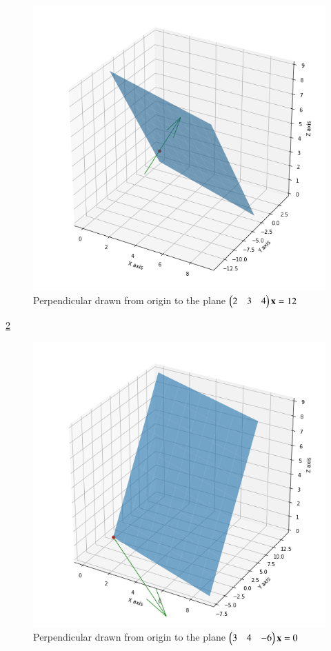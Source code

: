 \documentclass[journal,12pt,twocolumn]{IEEEtran}
\begin{document}
\begin{figure}[h!]
    \centering
    \includegraphics[width=\columnwidth]{plane1.png}
    \caption{Perpendicular drawn from origin to the plane $\begin{pmatrix}2&3&4\end{pmatrix}\mathbf{x} = 12$}
    \label{myfig}
\end{figure}
\ref{myfig}
\renewcommand{\thefigure}{b}
\begin{figure}[h!]
    \centering
    \includegraphics[width=\columnwidth]{plane2.png}
    \caption{Perpendicular drawn from origin to the plane $\begin{pmatrix}3&4&-6\end{pmatrix}\mathbf{x} = 0$}
    \label{myfig}
\end{figure}
\end{document}
